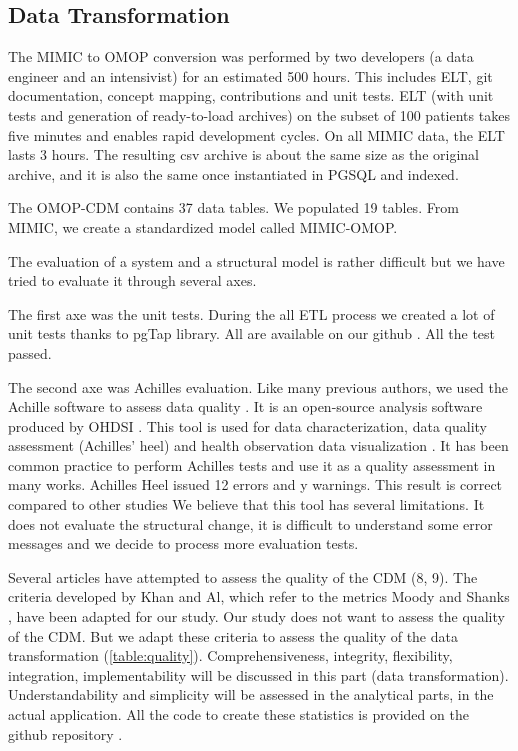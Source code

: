 %
% 
\subsection{Data Transformation}

The MIMIC to OMOP conversion was performed by two developers (a data engineer 
and an intensivist) for an estimated 500 hours. This includes ELT, git 
documentation, concept mapping, contributions and unit tests. 
ELT (with unit tests and generation of ready-to-load archives) on the subset 
of 100 patients takes five minutes and enables rapid development cycles. 
On all MIMIC data, the ELT lasts 3 hours. The resulting csv archive is about 
the same size as the original archive, and it is also the same once 
instantiated in PGSQL and indexed.

The OMOP-CDM contains 37 data tables. We populated 19 tables. 
From MIMIC, we create a standardized model called MIMIC-OMOP.

The evaluation of a system and a structural model is rather difficult \cite{moody-quality} 
but we have tried to evaluate it through several axes.

The first axe was the unit tests. During the all ETL process we created a lot 
of unit tests thanks to pgTap library. 
All are available on our github \cite{mimic-omop-website}. All the test passed.

The second axe was Achilles evaluation. Like many previous authors, 
we used the Achille software to assess data quality \cite{achilles-evaluation}. 
It is an open-source analysis software produced by OHDSI \cite{ohdsi-achilles}.
This tool is used for data characterization, data quality assessment 
(Achilles' heel) and health observation data visualization \cite{ohdsi-achilles}.
It has been common practice to perform Achilles tests and use it as a 
quality assessment in many works. Achilles Heel issued 12 errors and y warnings. 
This result is correct compared to other studies \cite{achilles-evaluation}
We believe that this tool has several limitations. It does not evaluate 
the structural change, it is difficult to understand some error messages and 
we decide to process more evaluation tests.     


Several articles have attempted to assess the quality of the CDM (8, 9). 
The criteria developed by Khan and Al\cite{khan-quality}, which refer to the metrics 
Moody and Shanks \cite{moody-quality}, have been adapted for our study. 
Our study does not want to assess the quality of the CDM. But we adapt these 
criteria to assess the quality of the data transformation (\ref{table:quality}).
Comprehensiveness, integrity, flexibility, integration, implementability 
will be discussed in this part (data transformation). 
Understandability and simplicity will be assessed in the analytical parts, 
in the actual application.
All the code to create these statistics is provided on the github repository 
\cite{mimic-omop-website}.

